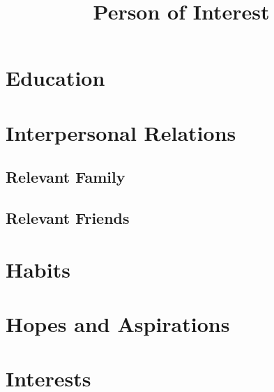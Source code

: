 \documentclass[11pt,executivepaper]{moderncv}
\title{Person of Interest}
\begin{document}
	\makecvtitle
	\section{Education}
	
	\cventry{}{}{}{}{}{}%
	
	
	\section{Interpersonal Relations}
	
	\subsection{Relevant Family}
	
	\cventry{}{}{}{}{}{}%
	
	
	\subsection{Relevant Friends}
	
	\cventry{}{}{}{}{}{}%
	
	
	\section{Habits}
	\renewcommand{\labelitemi}{\raisebox{1.5pt}{\texttt{[image: teapot.png]}}~}
	
	\cvlistdoubleitem{}{}%
	
	
	\section{Hopes and Aspirations}
	
	\cvitem{}{}
	
	
	\section{Interests}
	
	\renewcommand{\listitemsymbol}{\raisebox{1.5pt}{\texttt{[image: teapot.png]}}~} %
	
	\cvlistdoubleitem{}{}%
	\cvlistitem{}%
	
	
\end{document}
